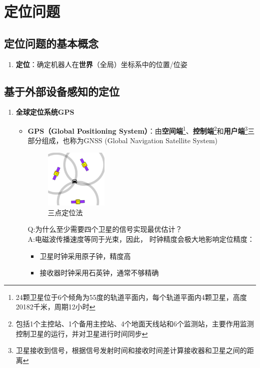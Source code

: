 \documentclass[../main.tex]{subfiles}
\begin{document}
\section{定位问题}
\subsection{定位问题的基本概念}
\begin{enumerate}
    \item \textbf{定位}：确定机器人在\textbf{世界}（全局）坐标系中的位置/位姿
\end{enumerate}
\subsection{基于外部设备感知的定位}
\begin{enumerate}
    \item \textbf{全球定位系统GPS}
    \begin{itemize}
        \item \textbf{GPS（Global Positioning System）}：由\textbf{空间端}\footnote{24颗卫星位于6个倾角为55度的轨道平面内，每个轨道平面内4颗卫星，高度20182千米，周期12小时}、\textbf{控制端}\footnote{包括1个主控站、1个备用主控站、4个地面天线站和6个监测站，主要作用监测控制卫星的运行，并对卫星进行时间同步}和\textbf{用户端}\footnote{卫星接收到信号，根据信号发射时间和接收时间差计算接收器和卫星之间的距离}三部分组成，也称为GNSS (Global Navigation Satellite System)
            \begin{figure}[H]
                \centering
                \includegraphics[width=0.3\textwidth]{images/gps.png}
                \caption{三点定位法}
            \end{figure}
        {\small\kaishu Q:为什么至少需要四个卫星的信号实现最优估计？\\A:电磁波传播速度等同于光束，因此，
时钟精度会极大地影响定位精度：
    \begin{itemize}
        \item 卫星时钟采用原子钟，精度高
        \item 接收器时钟采用石英钟，通常不够精确
    \end{itemize}
}
\end{itemize}
\end{enumerate}
\end{document}
